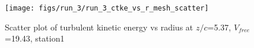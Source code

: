 \begin{figure}[H]
\centering
\texttt{[image: figs/run\_3/run\_3\_ctke\_vs\_r\_mesh\_scatter]}
\caption{Scatter plot of turbulent kinetic energy vs radius at $z/c$=5.37, $V_{free}$=19.43, station1}
\label{fig:run_3_ctke_vs_r_mesh_scatter}
\end{figure}


